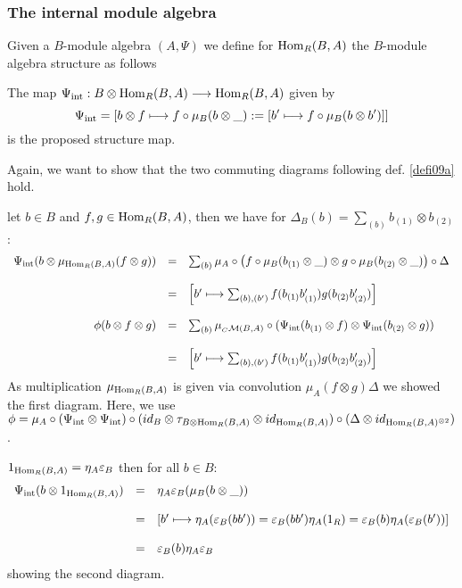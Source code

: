 \subsubsection{The internal module algebra}
Given a $B$-module algebra $(A,\Psi)$ we define for $\trm{Hom}_R(B,A)$ the $B$-module algebra structure
as follows
\begin{lemm}
The map $\Psi_{\trm{int}} : B \otimes \trm{Hom}_R(B,A) \longrightarrow \trm{Hom}_R(B,A)$ given
by
$$\Psi_{\trm{int}} = \left[b \otimes f\longmapsto f \circ \mu_B(b \otimes\_) := [b' \longmapsto f \circ \mu_B(b \otimes b')]\right]$$
is the proposed structure map.
\end{lemm}
\bws Again, we want to show that the two commuting diagrams following def. \ref{defi09a} hold.
\bn
\item let $b \in B$ and $f, g \in \trm{Hom}_R(B,A)$, then we have for $\Delta_B(b) = \sum_{(b)} b_{(1)} \otimes b_{(2)}$:
$$\bao{rcl}
\Psi_{\trm{int}}(b \otimes \mu_{\trm{Hom}_R(B,A)}(f \otimes g)) &=& \sum_{(b)} \mu_A\circ\left(f \circ \mu_B(b_{(1)} \otimes\_) \otimes g \circ \mu_B(b_{(2)} \otimes\_)\right)\circ\Delta\\
&&\\
&=& \left[b' \longmapsto \sum_{(b),(b')} f(b_{(1)} b'_{(1)}) g(b_{(2)} b'_{(2)})\right]\\
&&\\
\phi(b \otimes f \otimes g) &=& \sum_{(b)}\mu_{_C\mathcal{M}(B,A)} \circ (\Psi_{\trm{int}}(b_{(1)} \otimes f) \otimes \Psi_{\trm{int}}(b_{(2)} \otimes g))\\
&&\\
&=& \left[b' \longmapsto \sum_{(b),(b')} f(b_{(1)} b'_{(1)}) g(b_{(2)} b'_{(2)})\right]\\
\ea$$
As multiplication $\mu_{\trm{Hom}_R(B,A)}$ is given via convolution $\mu_A (f \otimes g) \Delta$ we showed the first diagram. Here, we use $\phi = \mu_A \circ (\Psi_{\trm{int}} \otimes \Psi_{\trm{int}}) \circ (id_B \otimes \tau_{B \otimes \trm{Hom}_R(B,A)} \otimes id_{\trm{Hom}_R(B,A)}) \circ (\Delta \otimes id_{\trm{Hom}_R(B,A)^{\otimes2}})$.
\item $1_{\trm{Hom}_R(B,A)} = \eta_A \eps_B$ then for all $b \in B$:
$$\bao{rcl}
\Psi_{\trm{int}}(b \otimes 1_{\trm{Hom}_R(B,A)}) &=& \eta_A\eps_B(\mu_B(b \otimes\_))\\
&&\\
&=& \left[b' \longmapsto \eta_A(\eps_B(b b')) = \eps_B(b b') \eta_A(1_R) = \eps_B(b) \eta_A(\eps_B(b'))\right]\\
&&\\
&=& \eps_B(b) \eta_A \eps_B\\ 
\ea$$
showing the second diagram.
\en
